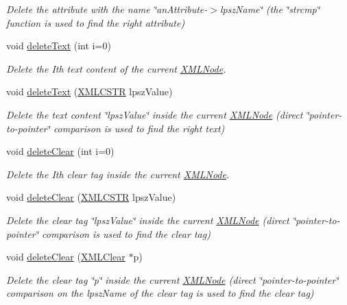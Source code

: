 \begin{DoxyCompactItemize}
\begin{DoxyCompactList}\small\item\em Delete the attribute with the name \char`\"{}an\-Attribute-\/$>$lpsz\-Name\char`\"{} (the \char`\"{}strcmp\char`\"{} function is used to find the right attribute) \end{DoxyCompactList}\item 
void \hyperlink{group__xmlDelete_ga14a49a23735ea10a44864cb6b4302250}{delete\-Text} (int i=0)
\begin{DoxyCompactList}\small\item\em Delete the Ith text content of the current \hyperlink{structXMLNode}{X\-M\-L\-Node}. \end{DoxyCompactList}\item 
void \hyperlink{group__xmlDelete_ga21ee499630d71ab6026753a85f02f582}{delete\-Text} (\hyperlink{xmlParser_8h_acdb0d6fd8dd596384b438d86cfb2b182}{X\-M\-L\-C\-S\-T\-R} lpsz\-Value)
\begin{DoxyCompactList}\small\item\em Delete the text content \char`\"{}lpsz\-Value\char`\"{} inside the current \hyperlink{structXMLNode}{X\-M\-L\-Node} (direct \char`\"{}pointer-\/to-\/pointer\char`\"{} comparison is used to find the right text) \end{DoxyCompactList}\item 
void \hyperlink{group__xmlDelete_ga44b72c82310eb4319dba46eb9cc9f6e9}{delete\-Clear} (int i=0)
\begin{DoxyCompactList}\small\item\em Delete the Ith clear tag inside the current \hyperlink{structXMLNode}{X\-M\-L\-Node}. \end{DoxyCompactList}\item 
void \hyperlink{group__xmlDelete_ga8fff4baa9a8000f8662ee302438fff64}{delete\-Clear} (\hyperlink{xmlParser_8h_acdb0d6fd8dd596384b438d86cfb2b182}{X\-M\-L\-C\-S\-T\-R} lpsz\-Value)
\begin{DoxyCompactList}\small\item\em Delete the clear tag \char`\"{}lpsz\-Value\char`\"{} inside the current \hyperlink{structXMLNode}{X\-M\-L\-Node} (direct \char`\"{}pointer-\/to-\/pointer\char`\"{} comparison is used to find the clear tag) \end{DoxyCompactList}\item 
void \hyperlink{group__xmlDelete_gae92182823d3d5b40893103ad222ec4a8}{delete\-Clear} (\hyperlink{structXMLClear}{X\-M\-L\-Clear} $\ast$p)
\begin{DoxyCompactList}\small\item\em Delete the clear tag \char`\"{}p\char`\"{} inside the current \hyperlink{structXMLNode}{X\-M\-L\-Node} (direct \char`\"{}pointer-\/to-\/pointer\char`\"{} comparison on the lpsz\-Name of the clear tag is used to find the clear tag) \end{DoxyCompactList}\item 

\end{DoxyCompactItemize}
